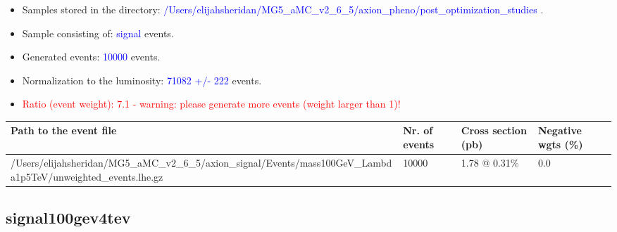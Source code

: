 \documentclass[a4paper, 10pt]{article}
\begin{document}
\begin{itemize}
  \item Samples stored in the directory: \textcolor{blue}{/\-Users/\-elijahsheridan/\-MG5\_aMC\_v2\_6\_5/\-axion\_pheno/\-post\_optimization\_studies} .
   \item Sample consisting of: \textcolor{blue}{signal}  events.
   \item Generated events: \textcolor{blue}{10000 }  events.
   \item Normalization to the luminosity: \textcolor{blue}{71082}\textcolor{blue}{ +/\-- }\textcolor{blue}{222 }  events.
   \item\textcolor{red}{Ratio (event weight): }\textcolor{red}{7.1 }\textcolor{red}{ - warning: please generate more events (weight larger than 1)!}
\textcolor{red}{}
\end{itemize}
\begin{table}[H]
  \begin{center}
    \begin{tabular}{|m{55.0mm}|m{25.0mm}|m{30.0mm}|m{30.0mm}|}
      \hline
      {\cellcolor{yellow}         Path to the event file}& {\cellcolor{yellow}         Nr. of events}& {\cellcolor{yellow}         Cross section (pb)}& {\cellcolor{yellow}         Negative wgts (\%)}\\
      \hline
      {\cellcolor{white}          /\-Users/\-elijahsheridan/\-MG5\_aMC\_v2\_6\_5/\-axion\_signal/\-Events/\-mass100GeV\_Lambda1p5TeV/\-unweighted\_events.lhe.gz}& {\cellcolor{white}          10000}& {\cellcolor{white}          1.78 @ 0.31\%}& {\cellcolor{white}          0.0}\\
\hline
    \end{tabular}
  \end{center}
\end{table}

\subsection{ signal100gev4tev}
\end{document}

